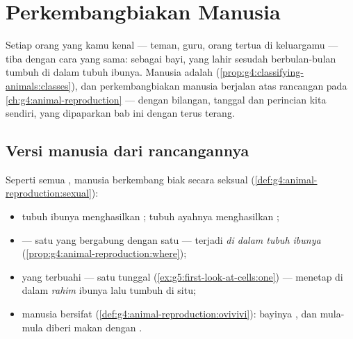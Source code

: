 \chapter{Perkembangbiakan Manusia}\label{ch:g5:human-reproduction}

Setiap orang yang kamu kenal --- teman, guru, orang tertua di
keluargamu --- tiba dengan cara yang sama: sebagai bayi, yang lahir
sesudah berbulan-bulan tumbuh di dalam tubuh ibunya. Manusia adalah
 (\cref{prop:g4:classifying-animals:classes}), dan
perkembangbiakan manusia berjalan atas rancangan  pada
\cref{ch:g4:animal-reproduction} --- dengan bilangan, tanggal dan
perincian  kita sendiri, yang dipaparkan bab ini dengan terus
terang.

\section{Versi manusia dari rancangannya}

\begin{proposition}\label{prop:g5:human-reproduction:plan}
Seperti semua , manusia berkembang biak secara seksual
(\cref{def:g4:animal-reproduction:sexual}):
\begin{itemize}
  \item tubuh ibunya menghasilkan \emph{}; tubuh ayahnya
        menghasilkan \emph{};
  \item {} --- satu  yang bergabung dengan satu  --- terjadi \emph{di dalam tubuh ibunya}
        (\cref{prop:g4:animal-reproduction:where});
  \item {} yang terbuahi --- satu  tunggal
        (\cref{ex:g5:first-look-at-cells:one}) --- menetap di dalam
        \emph{rahim} ibunya lalu tumbuh di situ;
  \item manusia bersifat 
        (\cref{def:g4:animal-reproduction:ovivivi}): bayinya , dan mula-mula diberi makan dengan .
\end{itemize}
\end{proposition}
\admitted

